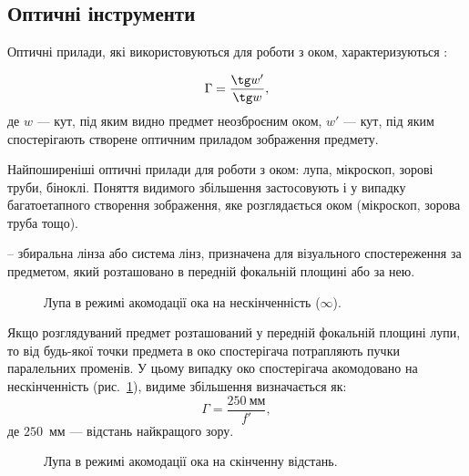 \subsection{Оптичні інструменти}

Оптичні прилади, які використовуються для роботи з оком, характеризуються :

\begin{equation}\label{eq:apparent increase}
	\Gamma = \frac{\tg w'}{\tg w},
\end{equation}
де $w$ ---  кут, під яким видно предмет неозброєним оком, $w'$ ---
кут, під яким спостерігають створене оптичним приладом зображення предмету.


Найпоширеніші оптичні прилади для роботи з оком: лупа, мікроскоп, зорові труби, біноклі. Поняття видимого збільшення застосовують і у випадку багатоетапного створення
зображення, яке розглядається оком (мікроскоп, зорова труба тощо).

 -- збиральна лінза або система лінз, призначена для візуального
спостереження за предметом, який розташовано в передній фокальній
площині або за нею.

\begin{figure}[h!]\centering
    
    \caption{Лупа в режимі акомодації ока на нескінченність ($\infty$).}
    \label{pic:Lupa}
\end{figure}

Якщо розглядуваний предмет розташований у передній фокальній площині лупи, то від будь-якої точки предмета в око спостерігача потрапляють пучки паралельних променів. У цьому випадку око спостерігача акомодовано на нескінченність (рис.~\ref{pic:Lupa}), видиме збільшення визначається як:
\begin{equation}\label{}
	\Gamma = \frac{250\ \text{мм}}{f'},
\end{equation}
де $250$~мм --- відстань найкращого зору.

\begin{figure}[h!]\centering
    
    \caption{Лупа в режимі акомодації ока на скінченну відстань.}
    \label{pic:rays_in_Lupa}
\end{figure}

